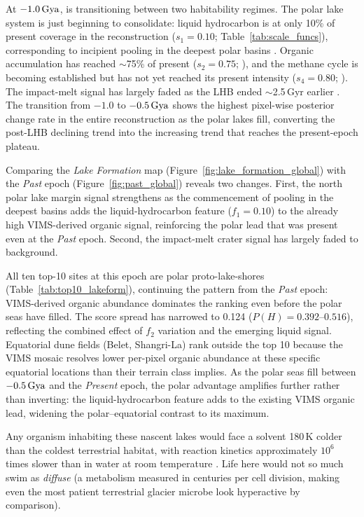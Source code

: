 At $-1.0\,\text{Gya}$, \titan{} is transitioning between two habitability regimes.  The polar lake system is just beginning to consolidate: liquid hydrocarbon is at only 10\% of present coverage in the reconstruction ($s_1 = 0.10$; Table~\ref{tab:scale_funcs}), corresponding to incipient pooling in the deepest polar basins \citep{Tobie2006,Hayes2016}.  Organic accumulation has reached $\sim$75\% of present ($s_2 = 0.75$; \citealt{Lavvas2011,Lorenz2008}), and the methane cycle is becoming established but has not yet reached its present intensity ($s_4 = 0.80$; \citealt{Tobie2006,MitchellLora2016}).  The impact-melt signal has largely faded as the LHB ended $\sim$2.5\,Gyr earlier \citep{OBrien2005}.  The transition from $-1.0$ to $-0.5\,\text{Gya}$ shows the highest pixel-wise posterior change rate in the entire reconstruction as the polar lakes fill, converting the post-LHB declining trend into the increasing trend that reaches the present-epoch plateau.

Comparing the \textit{Lake Formation} map (Figure~\ref{fig:lake_formation_global}) with the \textit{Past} epoch (Figure~\ref{fig:past_global}) reveals two changes.  First, the north polar lake margin signal strengthens as the commencement of pooling in the deepest basins adds the liquid-hydrocarbon feature ($f_1{=}0.10$) to the already high VIMS-derived organic signal, reinforcing the polar lead that was present even at the \textit{Past} epoch.  Second, the impact-melt crater signal has largely faded to background.

All ten top-10 sites at this epoch are polar proto-lake-shores (Table~\ref{tab:top10_lakeform}), continuing the pattern from the \textit{Past} epoch: VIMS-derived organic abundance dominates the ranking even before the polar seas have filled.  The score spread has narrowed to 0.124 ($P(H) = 0.392$--$0.516$), reflecting the combined effect of $f_2$ variation and the emerging liquid signal.  Equatorial dune fields (Belet, Shangri-La) rank outside the top 10 because the VIMS mosaic resolves lower per-pixel organic abundance at these specific equatorial locations than their terrain class implies.  As the polar seas fill between $-0.5\,\text{Gya}$ and the \textit{Present} epoch, the polar advantage amplifies further rather than inverting: the liquid-hydrocarbon feature adds to the existing VIMS organic lead, widening the polar--equatorial contrast to its maximum.

Any organism inhabiting these nascent lakes would face a solvent 180\,K colder than the coldest terrestrial habitat, with reaction kinetics approximately $10^{6}$ times slower than in water at room temperature \citep{SchulzeMakuch2005}.  Life here would not so much swim as \textit{diffuse} (a metabolism measured in centuries per cell division, making even the most patient terrestrial glacier microbe look hyperactive by comparison).

